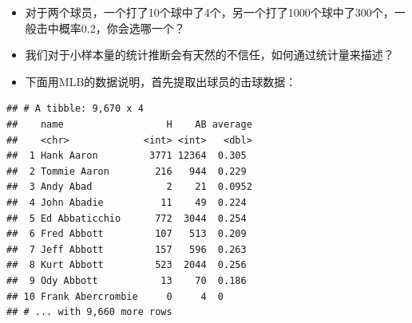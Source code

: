 \documentclass[]{book}
\newenvironment{Shaded}{\begin{snugshade}}{\end{snugshade}}
\newcommand{\CommentTok}[1]{\textcolor[rgb]{0.56,0.35,0.01}{\textit{#1}}}
\newcommand{\DataTypeTok}[1]{\textcolor[rgb]{0.13,0.29,0.53}{#1}}
\newcommand{\DecValTok}[1]{\textcolor[rgb]{0.00,0.00,0.81}{#1}}
\newcommand{\KeywordTok}[1]{\textcolor[rgb]{0.13,0.29,0.53}{\textbf{#1}}}
\newcommand{\NormalTok}[1]{#1}
\newcommand{\OperatorTok}[1]{\textcolor[rgb]{0.81,0.36,0.00}{\textbf{#1}}}
\newcommand{\StringTok}[1]{\textcolor[rgb]{0.31,0.60,0.02}{#1}}
\begin{document}
\begin{itemize}
\item
  对于两个球员，一个打了10个球中了4个，另一个打了1000个球中了300个，一般击中概率0.2，你会选哪一个？
\item
  我们对于小样本量的统计推断会有天然的不信任，如何通过统计量来描述？
\item
  下面用MLB的数据说明，首先提取出球员的击球数据：
\end{itemize}

\begin{Shaded}
\end{Shaded}

\begin{verbatim}
## # A tibble: 9,670 x 4
##    name                  H    AB average
##    <chr>             <int> <int>   <dbl>
##  1 Hank Aaron         3771 12364  0.305 
##  2 Tommie Aaron        216   944  0.229 
##  3 Andy Abad             2    21  0.0952
##  4 John Abadie          11    49  0.224 
##  5 Ed Abbaticchio      772  3044  0.254 
##  6 Fred Abbott         107   513  0.209 
##  7 Jeff Abbott         157   596  0.263 
##  8 Kurt Abbott         523  2044  0.256 
##  9 Ody Abbott           13    70  0.186 
## 10 Frank Abercrombie     0     4  0     
## # ... with 9,660 more rows
\end{verbatim}
\end{document}
